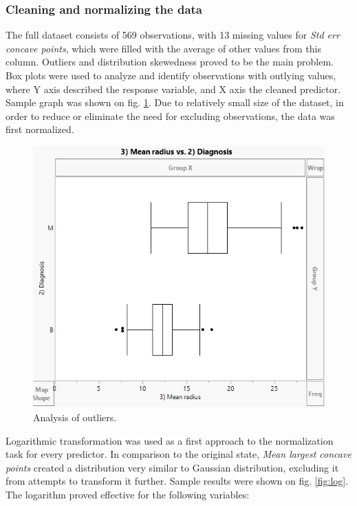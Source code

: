 	
	\subsubsection{Cleaning and normalizing the data}
	
	The full dataset consists of 569 observations, with 13 missing values for \textit{Std err concave points}, which were filled with the average of other values from this column. Outliers and distribution skewedness proved to be the main problem. Box plots were used to analyze and identify observations with outlying values, where Y axis described the response variable, and X axis the cleaned predictor. Sample graph was shown on fig. \ref{fig:boxgraph}. Due to relatively small size of the dataset, in order to reduce or eliminate the need for excluding observations, the data was first normalized.
	
	\begin{figure}[!ht]
		\centering
		\includegraphics[width=0.7\linewidth]{Rysunki/Rozdzial2/box_graph}
		\caption{Analysis of outliers.}
		\label{fig:boxgraph}
	\end{figure}
	
	Logarithmic transformation was used as a first approach to the normalization task for every predictor. In comparison to the original state, \textit{Mean largest concave points} created a distribution very similar to Gaussian distribution, excluding it from attempts to transform it further. Sample results were shown on fig. \ref{fig:log}. The logarithm proved effective for the following variables:
	
